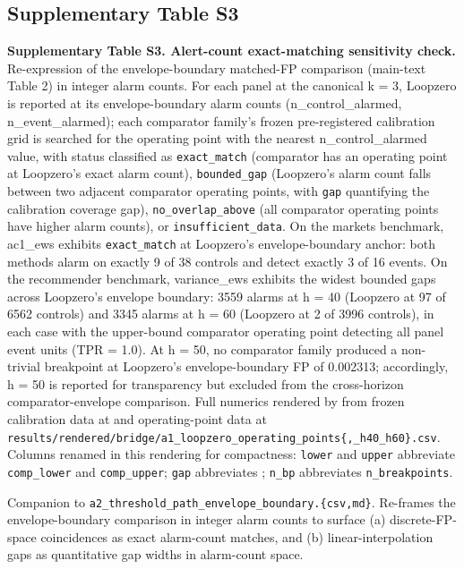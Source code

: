 \documentclass[
  11pt,
]{article}
\begin{document}
\subsection{Supplementary Table S3}\label{supplementary-table-s3}

\textbf{Supplementary Table S3. Alert-count exact-matching sensitivity
check.} Re-expression of the envelope-boundary matched-FP comparison
(main-text Table 2) in integer alarm counts. For each panel at the
canonical k = 3, Loopzero is reported at its envelope-boundary alarm
counts (n\_control\_alarmed, n\_event\_alarmed); each comparator
family's frozen pre-registered calibration grid is searched for the
operating point with the nearest n\_control\_alarmed value, with status
classified as \texttt{exact\_match} (comparator has an operating point
at Loopzero's exact alarm count), \texttt{bounded\_gap} (Loopzero's
alarm count falls between two adjacent comparator operating points, with
\texttt{gap} quantifying the calibration coverage gap),
\texttt{no\_overlap\_above} (all comparator operating points have higher
alarm counts), or \texttt{insufficient\_data}. On the markets benchmark,
ac1\_ews exhibits \texttt{exact\_match} at Loopzero's envelope-boundary
anchor: both methods alarm on exactly 9 of 38 controls and detect
exactly 3 of 16 events. On the recommender benchmark, variance\_ews
exhibits the widest bounded gaps across Loopzero's envelope boundary:
3559 alarms at h = 40 (Loopzero at 97 of 6562 controls) and 3345 alarms
at h = 60 (Loopzero at 2 of 3996 controls), in each case with the
upper-bound comparator operating point detecting all panel event units
(TPR = 1.0). At h = 50, no comparator family produced a non-trivial
breakpoint at Loopzero's envelope-boundary FP of 0.002313; accordingly,
h = 50 is reported for transparency but excluded from the cross-horizon
comparator-envelope comparison. Full numerics rendered by
\texttt{} from frozen
calibration data at
\texttt{} and
operating-point data at
\texttt{results/rendered/bridge/a1\_loopzero\_operating\_points\{,\_h40\_h60\}.csv}.
Columns renamed in this rendering for compactness: \texttt{lower} and
\texttt{upper} abbreviate \texttt{comp\_lower} and \texttt{comp\_upper};
\texttt{gap} abbreviates \texttt{}; \texttt{n\_bp}
abbreviates \texttt{n\_breakpoints}.

Companion to
\texttt{a2\_threshold\_path\_envelope\_boundary.\{csv,md\}}. Re-frames
the envelope-boundary comparison in integer alarm counts to surface (a)
discrete-FP-space coincidences as exact alarm-count matches, and (b)
linear-interpolation gaps as quantitative gap widths in alarm-count
space.
\end{document}
